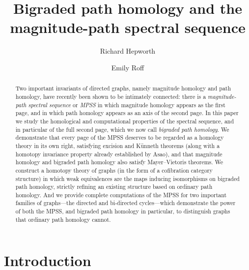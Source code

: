 \documentclass[a4paper, 11 pt, oneside, reqno]{amsart}
\title[Bigraded path homology and the MPSS]{Bigraded path homology and the magnitude-path spectral sequence}
\author{Richard Hepworth}
\author{Emily Roff}
\numberwithin{lemma}{section}
\theoremstyle{definition}
\begin{document}
\begin{abstract}
Two important invariants of directed graphs, namely magnitude homology and path homology, have recently been shown to be intimately connected: there is a \emph{magnitude-path spectral sequence} or \emph{MPSS} in which magnitude homology appears as the first page, and in which path homology appears as an axis of the second page.
In this paper we study the homological and computational properties of the spectral sequence, and in particular of the full second page, which we now call \emph{bigraded path homology}.
We demonstrate that every page of the MPSS deserves to be regarded as a homology theory in its own right, satisfying excision and K\"unneth theorems (along with a homotopy invariance property already established by Asao), and that magnitude homology and bigraded path homology also satisfy Mayer--Vietoris theorems.
We construct a homotopy theory of graphs (in the form of a cofibration category structure) in which weak equivalences are the maps inducing isomorphisms on bigraded path homology, strictly refining an existing structure based on ordinary path homology.
And we provide complete computations of the MPSS for two important families of graphs---the directed and bi-directed cycles---which demonstrate the power of both the MPSS, and bigraded path homology in particular, to distinguish graphs that ordinary path homology cannot.
\end{abstract}


\maketitle

\setcounter{tocdepth}{1}
\tableofcontents

\section{Introduction}
\end{document}
